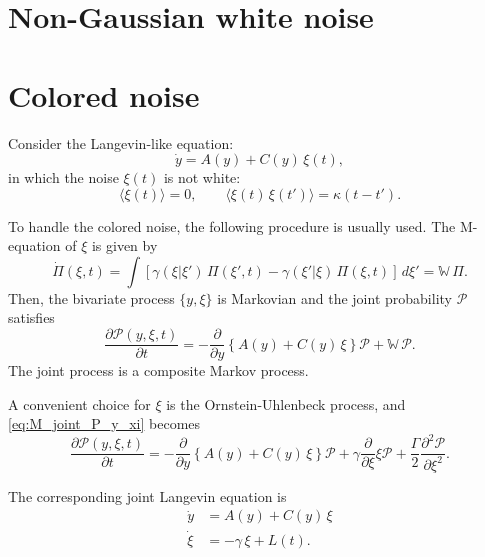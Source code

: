 \documentclass{book}
\numberwithin{equation}{section}
\theoremstyle{plain}
\theoremstyle{definition}
\theoremstyle{remark}
\theoremstyle{BoldStyle}
\numberwithin{exercise}{section}
\begin{document}
\section{Non-Gaussian white noise}

\section{Colored noise}

Consider the Langevin-like equation:
\begin{equation}
  \dot y = A(y) + C(y) \, \xi(t),
  \label{eq:Langevin_colored}
\end{equation}
in which the noise $\xi(t)$ is not white:
\begin{equation}
\langle \xi(t) \rangle = 0,
\qquad
\langle \xi(t) \, \xi(t') \rangle = \kappa(t - t').
\label{eq:colored_noise}
\end{equation}


To handle the colored noise, the following procedure
is usually used.
%
The M-equation of $\xi$ is given by
\begin{equation}
  \dot \Pi(\xi, t)
  =
  \int \left[
    \gamma(\xi|\xi') \, \Pi(\xi', t)
    -
    \gamma(\xi'|\xi) \, \Pi(\xi, t)
  \right] \, d\xi'
  =
  \mathbb{W} \, \Pi.
\end{equation}
Then,
the bivariate process $\{ y, \xi \}$ is Markovian
and the joint probability $\mathscr P$ satisfies
\begin{equation}
  \frac{ \partial \mathscr P(y, \xi, t) }{ \partial t }
  =
  - \frac{ \partial } { \partial y }
  \left\{
    A(y) + C(y) \, \xi
  \right\} \mathscr P
  +
  \mathbb W \, \mathscr P.
  \label{eq:M_joint_P_y_xi}
\end{equation}
The joint process is a composite Markov process.


A convenient choice for $\xi$ is the Ornstein-Uhlenbeck process,
and \eqref{eq:M_joint_P_y_xi} becomes
\begin{equation}
  \frac{ \partial \mathscr P(y, \xi, t) }{ \partial t }
  =
  - \frac{ \partial } { \partial y }
  \left\{
    A(y) + C(y) \, \xi
  \right\} \mathscr P
  +
  \gamma \frac{ \partial } { \partial \xi } \xi \mathscr P
  +\frac{ \Gamma } { 2 }
  \frac{ \partial^2 \mathscr P } { \partial \xi^2 }.
  \label{eq:FP_joint_y_xi}
\end{equation}

The corresponding joint Langevin equation is
\begin{equation}
\begin{aligned}
  \dot y &= A(y) + C(y) \, \xi \\
  \dot \xi &= -\gamma \, \xi + L(t).
\end{aligned}
\label{eq:Langevin_joint_y_xi}
\end{equation}
\end{document}
